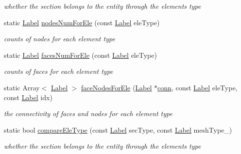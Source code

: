 \begin{DoxyCompactItemize}
\begin{DoxyCompactList}\small\item\em whether the section belongs to the entity through the elements type \item\end{DoxyCompactList}\item 
static \hyperlink{namespaceHSF_ae65d72be782e989396ebe5ec6ae4c2b6}{Label} \hyperlink{classHSF_1_1Section_a253bd8ce6b49a2c7c46d3b2588a787a9}{nodesNumForEle} (const \hyperlink{namespaceHSF_ae65d72be782e989396ebe5ec6ae4c2b6}{Label} eleType)
\begin{DoxyCompactList}\small\item\em counts of nodes for each element type \item\end{DoxyCompactList}\item 
static \hyperlink{namespaceHSF_ae65d72be782e989396ebe5ec6ae4c2b6}{Label} \hyperlink{classHSF_1_1Section_a44cf6f64b817e7126b03d4fda4b94b1a}{facesNumForEle} (const \hyperlink{namespaceHSF_ae65d72be782e989396ebe5ec6ae4c2b6}{Label} eleType)
\begin{DoxyCompactList}\small\item\em counts of faces for each element type \item\end{DoxyCompactList}\item 
static Array$<$ \hyperlink{namespaceHSF_ae65d72be782e989396ebe5ec6ae4c2b6}{Label} $>$ \hyperlink{classHSF_1_1Section_a6e45839e208a8e70af86e9d51a06d1cf}{faceNodesForEle} (\hyperlink{namespaceHSF_ae65d72be782e989396ebe5ec6ae4c2b6}{Label} $\ast$\hyperlink{classHSF_1_1Section_a21e40283b7ab3f9a90264724747b18b1}{conn}, const \hyperlink{namespaceHSF_ae65d72be782e989396ebe5ec6ae4c2b6}{Label} eleType, const \hyperlink{namespaceHSF_ae65d72be782e989396ebe5ec6ae4c2b6}{Label} idx)
\begin{DoxyCompactList}\small\item\em the connectivity of faces and nodes for each element type \item\end{DoxyCompactList}\item 
static bool \hyperlink{classHSF_1_1Section_af17737c4ca44540770552c8790f40897}{compareEleType} (const \hyperlink{namespaceHSF_ae65d72be782e989396ebe5ec6ae4c2b6}{Label} secType, const \hyperlink{namespaceHSF_ae65d72be782e989396ebe5ec6ae4c2b6}{Label} meshType\_\-)
\begin{DoxyCompactList}\small\item\em whether the section belongs to the entity through the elements type \item\end{DoxyCompactList}\end{DoxyCompactItemize}
